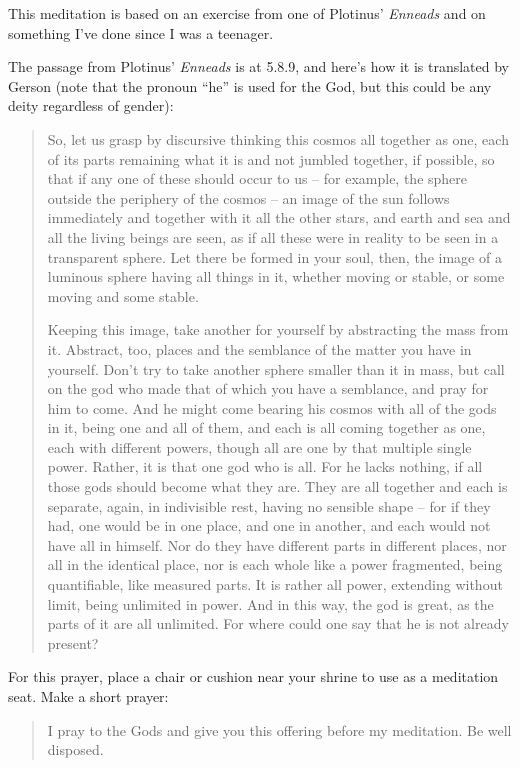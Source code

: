 \documentclass[
]{book}
\begin{document}
This meditation is based on an exercise from one of Plotinus' \emph{Enneads} and on something I've done since I was a teenager.

The passage from Plotinus' \emph{Enneads} is at 5.8.9, and here's how it is translated by Gerson (note that the pronoun ``he'' is used for the God, but this could be any deity regardless of gender):

\begin{quote}
So, let us grasp by discursive thinking this cosmos all together as one, each of its parts remaining what it is and not jumbled together, if possible, so that if any one of these should occur to us -- for example, the sphere outside the periphery of the cosmos -- an image of the sun follows immediately and together with it all the other stars, and earth and sea and all the living beings are seen, as if all these were in reality to be seen in a transparent sphere. Let there be formed in your soul, then, the image of a luminous sphere having all things in it, whether moving or stable, or some moving and some stable.

Keeping this image, take another for yourself by abstracting the mass from it. Abstract, too, places and the semblance of the matter you have in yourself. Don't try to take another sphere smaller than it in mass, but call on the god who made that of which you have a semblance, and pray for him to come. And he might come bearing his cosmos with all of the gods in it, being one and all of them, and each is all coming together as one, each with different powers, though all are one by that multiple single power. Rather, it is that one god who is all. For he lacks nothing, if all those gods should become what they are. They are all together and each is separate, again, in indivisible rest, having no sensible shape -- for if they had, one would be in one place, and one in another, and each would not have all in himself. Nor do they have different parts in different places, nor all in the identical place, nor is each whole like a power fragmented, being quantifiable, like measured parts. It is rather all power, extending without limit, being unlimited in power. And in this way, the god is great, as the parts of it are all unlimited. For where could one say that he is not already present?
\end{quote}

For this prayer, place a chair or cushion near your shrine to use as a meditation seat. Make a short prayer:

\begin{quote}
I pray to the Gods and give you this offering before my meditation. Be well disposed.
\end{quote}
\end{document}
